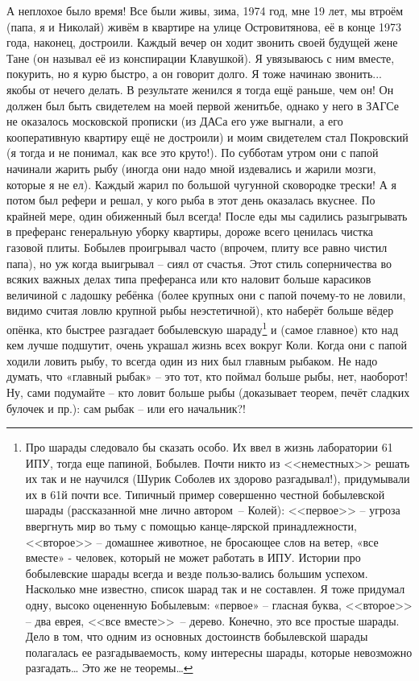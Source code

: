  А неплохое было время! Все были живы, зима, 1974 год, мне 19 лет, мы втроём (папа, я и Николай) живём в квартире на улице Островитянова, её в конце 1973 года, наконец, достроили. Каждый вечер он ходит звонить своей будущей жене Тане (он называл её из конспирации Клавушкой). Я увязываюсь с ним вместе, покурить, но я курю быстро, а он говорит долго. Я тоже начинаю звонить... якобы от нечего делать. В результате женился я тогда ещё раньше, чем он! Он должен был быть свидетелем на моей первой женитьбе, однако у него в ЗАГСе не оказалось московской прописки (из ДАСа его уже выгнали, а его кооперативную квартиру ещё не достроили) и моим свидетелем стал Покровский (я тогда и не понимал, как все это круто!). По субботам утром они с папой начинали жарить рыбу (иногда они надо мной издевались и жарили мозги, которые я не ел). Каждый жарил по большой чугунной сковородке трески! А я потом был рефери и решал, у кого рыба в этот день оказалась вкуснее. По крайней мере, один обиженный был всегда! После еды мы садились разыгрывать в преферанс генеральную уборку квартиры, дороже всего ценилась чистка газовой плиты. Бобылев проигрывал часто (впрочем, плиту все равно чистил папа), но уж когда выигрывал – сиял от счастья. Этот стиль соперничества во всяких важных делах типа преферанса или кто наловит больше карасиков величиной с ладошку ребёнка (более крупных они с папой почему-то не ловили, видимо считая ловлю крупной рыбы неэстетичной), кто наберёт больше вёдер опёнка, кто быстрее разгадает бобылевскую шараду\footnote{Про шарады следовало бы сказать особо. Их ввел в жизнь лаборатории 61 ИПУ, тогда еще папиной, Бобылев. Почти никто из <<неместных>> решать их так и не научился (Шурик Соболев их здорово разгадывал!), придумывали их в 61й почти все. Типичный пример совершенно честной бобылевской шарады (рассказанной мне лично автором~– Колей): <<первое>> – угроза ввергнуть мир во тьму с помощью канце-лярской принадлежности, <<второе>> – домашнее животное, не бросающее слов на ветер, «все вместе» - человек, который не может работать в ИПУ. Истории про бобылевские шарады всегда и везде пользо-вались большим успехом. Насколько мне известно, список шарад так и не составлен. Я тоже придумал одну, высоко оцененную Бобылевым: «первое» – гласная буква, <<второе>> – два еврея, <<все вместе>>~– дерево. Конечно, это все простые шарады. Дело в том, что одним из основных достоинств бобылевской шарады полагалась ее разгадываемость, кому интересны шарады, которые невозможно разгадать… Это же не теоремы\ldots} и (самое главное) кто над кем лучше подшутит, очень украшал жизнь всех вокруг Коли. Когда они с папой ходили ловить рыбу, то всегда один из них был главным рыбаком. Не надо думать, что «главный рыбак» – это тот, кто поймал больше рыбы, нет, наоборот! Ну, сами подумайте – кто ловит больше рыбы (доказывает теорем, печёт сладких булочек и пр.): сам рыбак – или его начальник?!

